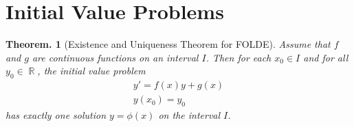 \documentclass[11pt, a4paper]{memoir}
\DeclareMathOperator{\R}{{\mathbb{R}}}
\theoremstyle{change}
\newtheorem{theorem}{Theorem.}[section]
\theoremstyle{plain}
\theoremstyle{nonumberplain}
\numberwithin{equation}{section}
\begin{document}
\section{Initial Value Problems}
\begin{theorem}[Existence and Uniqueness Theorem for FOLDE]
    Assume that $f$ and $g$ are continuous functions on an interval $I$. Then for each $x_0 \in I$ and for all $y_0 \in \R$, the initial value problem
    \begin{align*}
        y' = f(x)y + g(x)\\
        y(x_0) = y_0
    \end{align*}
    has exactly one solution $y = \phi(x)$ on the interval $I$.
\end{theorem}
\end{document}
